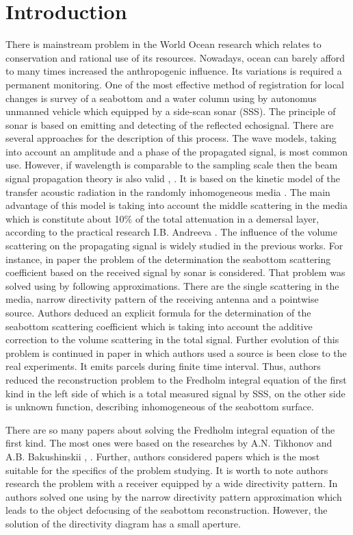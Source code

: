 \documentclass{procDDs}
\begin{document}
\section{Introduction}
There is mainstream problem in the World Ocean research which relates to conservation and rational use of its resources. Nowadays, ocean can barely afford to many times increased the anthropogenic influence. Its variations is required a permanent monitoring. One of the most effective method of registration for local changes is survey of a seabottom and a water column using by autonomus unmanned vehicle which equipped by a side-scan sonar (SSS). The principle of sonar is based on emitting and detecting of the reflected echosignal. There are several approaches for the description of this process. The wave models, taking into account an amplitude and a phase of the propagated signal, is most common use. However, if wavelength is comparable to the sampling scale then the beam signal propagation theory is also valid \cite{Turner}, \cite{Zurk}. It is based on the kinetic model of the transfer acoustic radiation in the randomly inhomogeneous media \cite{SMJ2015}. The main advantage of this model is taking into account the middle scattering in the media which is constitute about 10\% of the total attenuation in a demersal layer, according to the practical research I.B. Andreeva \cite{Andreeva}. The influence of the volume scattering on the propagating signal is widely studied in the previous works. For instance, in paper \cite{AF2015} the problem of the determination the seabottom scattering coefficient based on the received signal by sonar is considered. That problem was solved using by following approximations. There are the single scattering in the media, narrow directivity pattern of the receiving antenna and a pointwise source. Authors deduced an explicit formula for the determination of the seabottom scattering coefficient which is taking into account the additive correction to the volume scattering in the total signal. Further evolution of this problem is continued in paper \cite{SPIE_KOV} in which authors used a source is been close to the real experiments. It emits parcels during finite time interval. Thus, authors reduced the reconstruction problem to the Fredholm integral equation of the first kind in the left side of which is a total measured signal by SSS,  on the other side is unknown function, describing inhomogeneous of the seabottom surface.

There are so many papers about solving the Fredholm integral equation of the first kind. The most ones were based on the researches by A.N. Tikhonov and A.B. Bakushinskii \cite{Tikhonov}, \cite{Baku}. Further, authors considered papers which is the most suitable for the specifics of the problem studying. It is worth to note authors research the problem with a receiver equipped by  a wide directivity pattern. In \cite{PRUAC} authors solved one using by the narrow directivity pattern approximation which leads to the object defocusing of the seabottom reconstruction. However, the solution of the directivity diagram has a small aperture.
\end{document}
